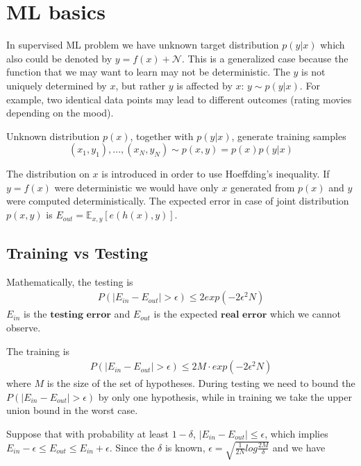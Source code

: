 \documentclass[../../main.tex]{subfiles}
\numberwithin{equation}{section}
\begin{document}
\section{ML basics}
In supervised ML problem we have unknown target distribution $p(y|x)$ which also could be denoted by $y=f(x) + \mathcal{N}$. This is a generalized case because the function that we may want to learn may not be deterministic. The $y$ is not uniquely determined by $x$, but rather $y$ is affected by $x$: $y\sim p(y|x)$. For example, two identical data points may lead to different outcomes (rating movies depending on the mood).

Unknown distribution $p(x)$, together with $p(y|x)$, generate training samples $$(x_1, y_1), ..., (x_N, y_N) \sim p(x, y)=p(x)p(y|x)$$

The distribution on $x$ is introduced in order to use Hoeffding's inequality. If $y=f(x)$ were deterministic we would have only $x$ generated from $p(x)$ and $y$ were computed deterministically.
The expected error in case of joint distribution $p(x, y)$ is $E_{out}=\mathbb{E}_{x, y}[e(h(x), y)]$.

\subsection{Training vs Testing}
Mathematically, the testing is
\begin{align}
    P(|E_{in} - E_{out}|>\epsilon) \leq 2 exp(-2\epsilon^2N)
\end{align}
$E_{in}$ is the $\textbf{testing error}$ and $E_{out}$ is the expected $\textbf{real error}$ which we cannot observe. 

The training is
\begin{align}
    P(|E_{in} - E_{out}|>\epsilon) \leq 2 M\cdot exp(-2\epsilon^2N)
\end{align}\label{eqn:hoeffding-training}
where $M$ is the size of the set of hypotheses. During testing we need to bound the $P(|E_{in} - E_{out}|>\epsilon)$ by only one hypothesis, while in training we take the upper union bound in the worst case.

Suppose that with probability at least $1-\delta$, $|E_{in}-E_{out}|\leq \epsilon$, which implies $E_{in}-\epsilon \leq E_{out}\leq E_{in}+\epsilon$. Since the $\delta$ is known, $\epsilon=\sqrt{\frac{1}{2N}log\frac{2M}{\delta}}$ and we have 
\end{document}
